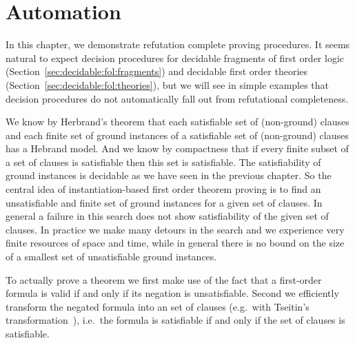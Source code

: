 
\chapter{Automation}



In this chapter, we demonstrate refutation complete proving procedures.
It seems natural to expect decision procedures
for decidable fragments of first order logic
(Section~\ref{sec:decidable:fol:fragments})
and decidable first order theories (Section~\ref{sec:decidable:fol:theories}),
but we will see in simple examples that decision procedures do not automatically
fall out from refutational completeness.


%
We know by Herbrand's theorem
that each satisfiable set of (non-ground) clauses
and each finite set of ground instances of a satisfiable set of (non-ground) clauses
has a Hebrand model.
And we know by compactness
that if every finite subset of a set of clauses is satisfiable then this set is satisfiable.
The satisfiability of ground instances is decidable as we have seen in the previous chapter.
So the central idea of instantiation-based first order theorem proving
is to find an unsatisfiable and finite set of ground instances for a given set of clauses.
In general a failure in this search does not show satisfiability of the given set of clauses.
In practice we make many detours in the search and we experience very finite resources of space and time,
while in general there is no bound on the size of a smallest set of unsatisfiable ground instances.



To actually prove a theorem
we first make use of the fact that a first-order formula is valid if and only if its negation is unsatisfiable.
Second we efficiently transform the negated formula into an {} set of clauses
(e.g.~with Tseitin's transformation~\cite{tseitin70}),
i.e.~the formula is satisfiable if and only if the set of clauses is satisfiable.


